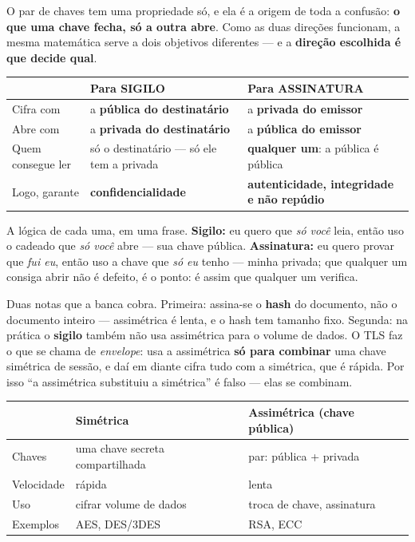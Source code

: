 \begin{conceito}
O par de chaves tem uma propriedade só, e ela é a origem de toda a confusão:
\textbf{o que uma chave fecha, só a outra abre}. Como as duas direções
funcionam, a mesma matemática serve a dois objetivos diferentes --- e a
\textbf{direção escolhida é que decide qual}.

\begin{center}
\begin{tabular}{@{}p{2.6cm}p{4.4cm}p{4.6cm}@{}}
\toprule
& \textbf{Para SIGILO} & \textbf{Para ASSINATURA} \\
\midrule
Cifra com & a \textbf{pública do destinatário} & a \textbf{privada do emissor} \\
Abre com & a \textbf{privada do destinatário} & a \textbf{pública do emissor} \\
Quem consegue ler & só o destinatário --- só ele tem a privada & \textbf{qualquer um}: a pública é pública \\
Logo, garante & \textbf{confidencialidade} & \textbf{autenticidade, integridade e não repúdio} \\
\bottomrule
\end{tabular}
\end{center}

A lógica de cada uma, em uma frase. \textbf{Sigilo:} eu quero que \emph{só
você} leia, então uso o cadeado que \emph{só você} abre --- sua chave pública.
\textbf{Assinatura:} eu quero provar que \emph{fui eu}, então uso a chave que
\emph{só eu} tenho --- minha privada; que qualquer um consiga abrir não é
defeito, é o ponto: é assim que qualquer um verifica.

Duas notas que a banca cobra. Primeira: assina-se o \textbf{hash} do
documento, não o documento inteiro --- assimétrica é lenta, e o hash tem
tamanho fixo. Segunda: na prática o \textbf{sigilo} também não usa assimétrica
para o volume de dados. O TLS faz o que se chama de \emph{envelope}: usa a
assimétrica \textbf{só para combinar} uma chave simétrica de sessão, e daí em
diante cifra tudo com a simétrica, que é rápida. Por isso ``a assimétrica
substituiu a simétrica'' é falso --- elas se combinam.
\end{conceito}

\begin{center}
\begin{tabular}{@{}p{2.6cm}p{4.6cm}p{4.6cm}@{}}
\toprule
& \textbf{Simétrica} & \textbf{Assimétrica (chave pública)} \\
\midrule
Chaves & uma chave secreta compartilhada & par: pública + privada \\
Velocidade & rápida & lenta \\
Uso & cifrar volume de dados & troca de chave, assinatura \\
Exemplos & AES, DES/3DES & RSA, ECC \\
\bottomrule
\end{tabular}
\end{center}

